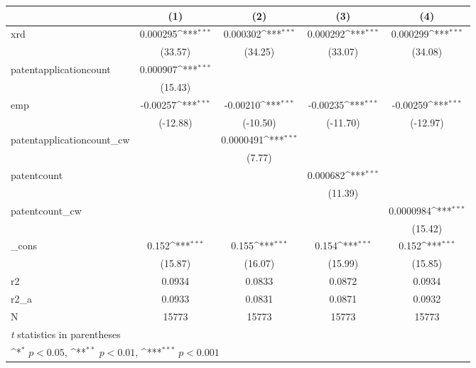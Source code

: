 {
\def\sym#1{\ifmmode^{#1}\else\(^{#1}\)\fi}
\begin{tabular}{l*{4}{c}}
\hline\hline
            &\multicolumn{1}{c}{(1)}         &\multicolumn{1}{c}{(2)}         &\multicolumn{1}{c}{(3)}         &\multicolumn{1}{c}{(4)}         \\
\hline
xrd         &    0.000295\sym{***}&    0.000302\sym{***}&    0.000292\sym{***}&    0.000299\sym{***}\\
            &     (33.57)         &     (34.25)         &     (33.07)         &     (34.08)         \\
[1em]
patentapplicationcount&    0.000907\sym{***}&                     &                     &                     \\
            &     (15.43)         &                     &                     &                     \\
[1em]
emp         &    -0.00257\sym{***}&    -0.00210\sym{***}&    -0.00235\sym{***}&    -0.00259\sym{***}\\
            &    (-12.88)         &    (-10.50)         &    (-11.70)         &    (-12.97)         \\
[1em]
patentapplicationcount\_cw&                     &   0.0000491\sym{***}&                     &                     \\
            &                     &      (7.77)         &                     &                     \\
[1em]
patentcount &                     &                     &    0.000682\sym{***}&                     \\
            &                     &                     &     (11.39)         &                     \\
[1em]
patentcount\_cw&                     &                     &                     &   0.0000984\sym{***}\\
            &                     &                     &                     &     (15.42)         \\
[1em]
\_cons      &       0.152\sym{***}&       0.155\sym{***}&       0.154\sym{***}&       0.152\sym{***}\\
            &     (15.87)         &     (16.07)         &     (15.99)         &     (15.85)         \\
\hline
r2          &      0.0934         &      0.0833         &      0.0872         &      0.0934         \\
r2\_a        &      0.0933         &      0.0831         &      0.0871         &      0.0932         \\
N           &       15773         &       15773         &       15773         &       15773         \\
\hline\hline
\multicolumn{5}{l}{\footnotesize \textit{t} statistics in parentheses}\\
\multicolumn{5}{l}{\footnotesize \sym{*} \(p<0.05\), \sym{**} \(p<0.01\), \sym{***} \(p<0.001\)}\\
\end{tabular}
}
